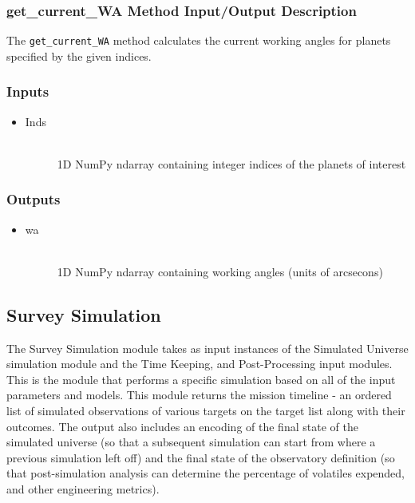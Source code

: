 \documentclass[cleanfoot]{asme2ej}
\begin{document}
\subsubsection{get\_current\_WA Method Input/Output Description} \label{sec:getcurrentWAtask}
The \verb+get_current_WA+ method calculates the current working angles for planets specified by the given indices.

\subsubsection*{Inputs}
\begin{itemize}
    \item 
    \begin{description}
        \item[Inds] \hfill \\
        1D NumPy ndarray containing integer indices of the planets of interest
    \end{description}
\end{itemize}

\subsubsection*{Outputs}
\begin{itemize}
    \item 
    \begin{description}
        \item[wa] \hfill \\
        1D NumPy ndarray containing working angles (units of arcsecons)
    \end{description}
\end{itemize}


\subsection{Survey Simulation} \label{sec:surveysim}
The Survey Simulation module takes as input instances of the Simulated Universe simulation module and the Time Keeping, and Post-Processing input modules. This is the module that performs a specific simulation based on all of the input parameters and models. This module returns the mission timeline - an ordered list of simulated observations of various targets on the target list along with their outcomes.  The output also includes an encoding of the final state of the simulated universe (so that a subsequent simulation can start from where a previous simulation left off) and the final state of the observatory definition (so that post-simulation analysis can determine the percentage of volatiles expended, and other engineering metrics).
\end{document}
